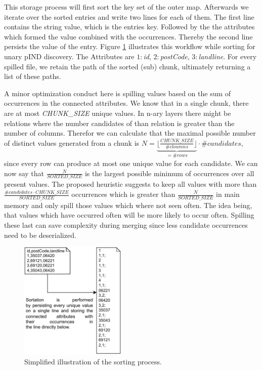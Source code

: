 This storage process will first sort the key set of the outer map. Afterwards we iterate over the sorted entries and write two lines for each of them. The first line contains the string value, which is the entries key. Followed by the the attributes which formed the value combined with the occurrences. Thereby the second line persists the value of the entry. Figure \ref{fig:sorting} illustrates this workflow while sorting for unary pIND discovery. The Attributes are $1:$\textit{id}, $2:$\textit{postCode}, $3:$\textit{landline}. For every spilled file, we retain the path of the sorted (sub) chunk, ultimately returning a list of these paths.

A minor optimization conduct here is spilling values based on the sum of occurrences in the connected attributes. We know that in a single chunk, there are at most \textit{CHUNK\_SIZE} unique values. In n-ary layers there might be relations where the number candidates of than relation is greater than the number of columns. Therefor we can calculate that the maximal possible number of distinct values generated from a chunk is $N = \underbrace{\lfloor \frac{CHUNK\_SIZE}{\#cloumns} \rfloor}_{= \#rows} \cdot \#candidates$, since every row can produce at most one unique value for each candidate. We can now say that $\frac{N}{SORTED\_SIZE}$ is the largest possible minimum of occurrences over all present values. The proposed heuristic suggests to keep all values with more than $\frac{\#candidates \cdot CHUNK\_SIZE}{SORTED\_SIZE}$ occurrences which is greater than $\frac{N}{SORTED\_SIZE}$ in main memory and only spill those values which where not seen often. The idea being, that values which have occurred often will be more likely to occur often. Spilling these last can save complexity during merging since less candidate occurrences need to be deserialized.

\begin{figure}[h]
    \centering
    \includegraphics[width=0.45\textwidth]{figures/Sorting.pdf}
    \caption{Simplified illustration of the sorting process.}
    \label{fig:sorting}
\end{figure}

